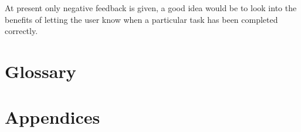 \documentclass{article}
\begin{document}
\newpage


\newpage


\newpage


\newpage


At present only negative feedback is given, a good idea would be to look into the benefits of letting the user know when a particular task has been completed correctly.

\newpage


\newpage
\section{Glossary}

\newpage
\section{Appendices}

\newpage
{}

\end{document}
